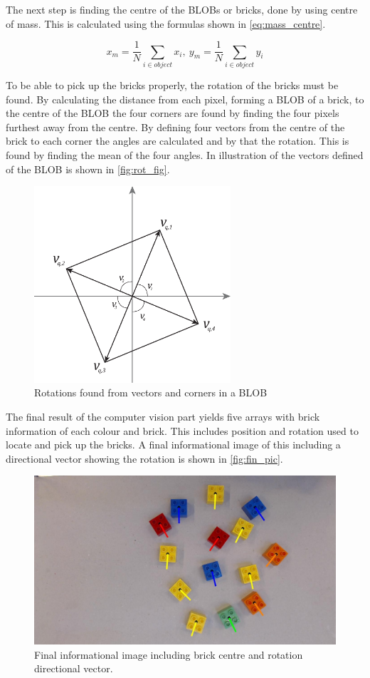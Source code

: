 The next step is finding the centre of the BLOBs or bricks, done by using centre of mass. This is calculated using the formulas shown in \autoref{eq:mass_centre}.

\begin{equation}\label{eq:mass_centre}
	x_m = \frac{1}{N}\sum_{i \in object}x_i, ~y_m= \frac{1}{N}\sum_{i \in object}y_i 
\end{equation}


To be able to pick up the bricks properly, the rotation of the bricks must be found. By calculating the distance from each pixel, forming a BLOB of a brick, to the centre of the BLOB the four corners are found by finding the four pixels furthest away from the centre. By defining four vectors from the centre of the brick to each corner the angles are calculated and by that the rotation. This is found by finding the mean of the four angles. In illustration of the vectors defined of the BLOB is shown in \autoref{fig:rot_fig}.

\begin{figure}[H]
	\centering
	\includegraphics[width=0.65\textwidth]{figures/rot_fig}
	\caption{Rotations found from vectors and corners in a BLOB}
	\label{fig:rot_fig}
\end{figure}

The final result of the computer vision part yields five arrays with brick information of each colour and brick. This includes position and rotation used to locate and pick up the bricks. A final informational image of this including a directional vector showing the rotation is shown in \autoref{fig:fin_pic}.

\begin{figure}[H]
	\centering
	\includegraphics[width=\textwidth]{figures/fin_pic.jpg}
	\caption{Final informational image including brick centre and rotation directional vector.}
	\label{fig:fin_pic}
\end{figure}